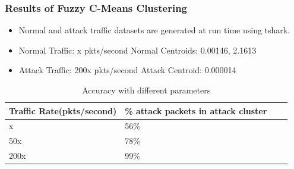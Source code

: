\documentclass[10pt]{beamer}
\begin{document}
\begin{frame}
\frametitle{Results of Fuzzy C-Means Clustering}

\begin{itemize}
\footnotesize
\item
Normal and attack traffic datasets are generated at run time using tshark.

\item
Normal Traffic: x pkts/second
\newline
Normal Centroids: 0.00146, 2.1613

\item
Attack Traffic: 200x pkts/second
\newline
Attack Centroid: 0.000014
\end{itemize}

\begin{table}
\scriptsize
\begin{center}
\begin{tabular}{ | m{2cm} | m{2cm}| m{2cm} | m{2cm} |} 
\hline
\textbf{Traffic Rate(pkts/second)} & \textbf{\% attack packets in attack cluster} \\
\hline
x &
56\% \\
\hline
50x &
78\% \\
\hline
200x &
99\% \\
\hline
\end{tabular}
\end{center}
\caption{\footnotesize Accuracy with different parameters}
\end{table}
\end{frame}
\end{document}
